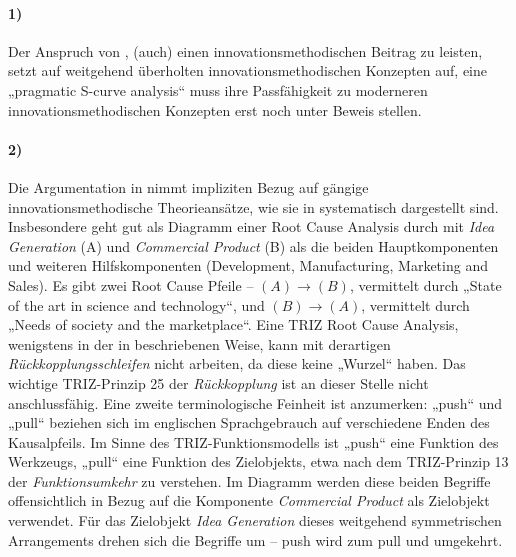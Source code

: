 \documentclass[11pt,a4paper]{article}
\begin{document}
\paragraph{1)}
Der Anspruch von \cite{TESE2018}, (auch) einen innovationsmethodischen Beitrag
zu leisten, setzt auf weitgehend überholten innovationsmethodischen Konzepten
auf, eine „pragmatic S-curve analysis“ muss ihre Passfähigkeit zu moderneren
innovationsmethodischen Konzepten erst noch unter Beweis stellen.

\paragraph{2)}
Die Argumentation in \cite{TESE2018} nimmt impliziten Bezug auf gängige
innovationsmethodische Theorieansätze, wie sie in \cite{Preez2006}
systematisch dargestellt sind.  Insbesondere \cite[Fig. 3]{Preez2006} geht gut
als Diagramm einer Root Cause Analysis durch mit \emph{Idea Generation} (A)
und \emph{Commercial Product} (B) als die beiden Hauptkomponenten und weiteren
Hilfskomponenten (Development, Manufacturing, Marketing and Sales).  Es gibt
zwei Root Cause Pfeile -- $(A) \longrightarrow (B)$, vermittelt durch „State
of the art in science and technology“, und $(B) \longrightarrow (A)$,
vermittelt durch „Needs of society and the marketplace“. Eine TRIZ Root Cause
Analysis, wenigstens in der in \cite[Kap. 4.7]{KS2017} beschriebenen Weise,
kann mit derartigen \emph{Rückkopplungsschleifen} nicht arbeiten, da diese
keine „Wurzel“ haben. Das wichtige TRIZ-Prinzip 25 der \emph{Rückkopplung} ist
an dieser Stelle nicht anschlussfähig.  Eine zweite terminologische Feinheit
ist anzumerken: „push“ und „pull“ beziehen sich im englischen Sprachgebrauch
auf verschiedene Enden des Kausalpfeils. Im Sinne des TRIZ-Funktionsmodells
\cite[Kap. 4.4]{KS2017} ist „push“ eine Funktion des Werkzeugs, „pull“ eine
Funktion des Zielobjekts, etwa nach dem TRIZ-Prinzip 13 der
\emph{Funktionsumkehr} zu verstehen.  Im Diagramm \cite[Fig. 3]{Preez2006}
werden diese beiden Begriffe offensichtlich in Bezug auf die Komponente
\emph{Commercial Product} als Zielobjekt verwendet.  Für das Zielobjekt
\emph{Idea Generation} dieses weitgehend symmetrischen Arrangements drehen
sich die Begriffe um -- push wird zum pull und umgekehrt.
\end{document}
